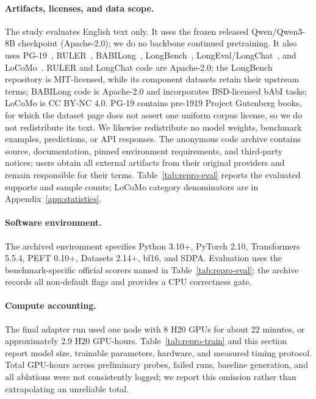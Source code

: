 \paragraph{Artifacts, licenses, and data scope.}
The study evaluates English text only. It uses the frozen released
Qwen/Qwen3-8B checkpoint (Apache-2.0); we do no backbone continued pretraining.
It also uses PG-19~\citep{pg19}, RULER~\citep{ruler}, BABILong~\citep{babilong},
LongBench~\citep{longbench}, LongEval/LongChat~\citep{longchat}, and
LoCoMo~\citep{locomo}. RULER and LongChat code are Apache-2.0; the LongBench
repository is MIT-licensed, while its component datasets retain their upstream
terms; BABILong code is Apache-2.0 and incorporates BSD-licensed bAbI tasks;
LoCoMo is CC BY-NC 4.0. PG-19 contains pre-1919 Project Gutenberg books, for
which the dataset page does not assert one uniform corpus license, so we do not
redistribute its text. We likewise redistribute no model weights, benchmark
examples, predictions, or API responses. The anonymous code archive contains
source, documentation, pinned environment requirements, and third-party notices;
users obtain all external artifacts from their original providers and remain
responsible for their terms. Table~\ref{tab:repro-eval} reports the evaluated
supports and sample counts; LoCoMo category denominators are in
Appendix~\ref{app:statistics}.

\paragraph{Software environment.}
The archived environment specifies Python 3.10+, PyTorch 2.10,
Transformers 5.5.4, PEFT 0.10+, Datasets 2.14+, bf16, and SDPA. Evaluation uses
the benchmark-specific official scorers named in Table~\ref{tab:repro-eval}; the
archive records all non-default flags and provides a CPU correctness gate.

\paragraph{Compute accounting.}
The final adapter run used one node with 8 H20 GPUs for about 22 minutes, or
approximately 2.9 H20 GPU-hours. Table~\ref{tab:repro-train} and this section
report model size, trainable parameters, hardware, and measured timing protocol.
Total GPU-hours across preliminary probes, failed runs, baseline generation, and
all ablations were not consistently logged; we report this omission rather than
extrapolating an unreliable total.

